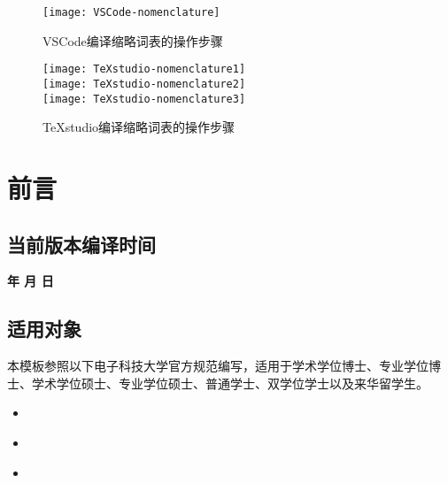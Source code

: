 \documentclass[doctor, vlined]{DissertUESTC}
\begin{document}
	\begin{figure}[!htb]
		\centering
		\texttt{[image: VSCode-nomenclature]}
		\caption{VSCode编译缩略词表的操作步骤} \label{fig: VSCode编译缩略词表}
	\end{figure}
	\begin{figure}[!htb]
		\centering
		\texttt{[image: TeXstudio-nomenclature1]}
		\\
		\texttt{[image: TeXstudio-nomenclature2]}
		\\
		\texttt{[image: TeXstudio-nomenclature3]}
		\caption{TeXstudio编译缩略词表的操作步骤} \label{fig: TeXstudio编译缩略词表}
	\end{figure}
	
	

	\chapter{前言}
	\section{当前版本编译时间}
	\noindent%
	\begin{center}%
		\bfseries\color{DarkRed}%
		\zhdigits*{\the\year} 年\zhnumber{\the\month} 月\zhnumber{\the\day} 日\;\xxivtime
	\end{center}

	\section{适用对象}
	
	本模板参照以下电子科技大学官方规范编写，适用于学术学位博士、专业学位博士、学术学位硕士、专业学位硕士、普通学士、双学位学士以及来华留学生。
	\begin{itemize}
		\item \href{https://gr.uestc.edu.cn/xiazai/114/3917}{\color{DarkRed}}
		\item \href{https://www.sice.uestc.edu.cn/info/1140/14689.htm}{\color{DarkRed}}
		\item \href{https://www.jwc.uestc.edu.cn/info/1507170256521551874}{\color{DarkRed}}
	\end{itemize}
	
\end{document}
